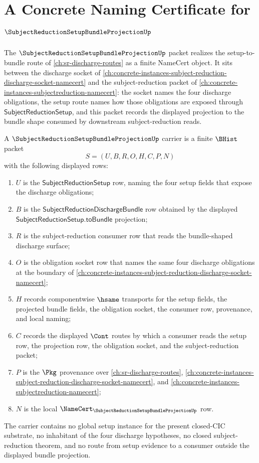\chapter{A Concrete Naming Certificate for $\SubjectReductionSetupBundleProjectionUp$}
\label{ch:concrete-instances-subjectreductionsetupbundleprojection-namecert}

The $\SubjectReductionSetupBundleProjectionUp$ packet realizes the setup-to-bundle route of \autoref{ch:sr-discharge-routes} as a finite NameCert object. It sits between the discharge socket of \autoref{ch:concrete-instances-subject-reduction-discharge-socket-namecert} and the subject-reduction packet of \autoref{ch:concrete-instances-subjectreduction-namecert}: the socket names the four discharge obligations, the setup route names how those obligations are exposed through $\mathsf{SubjectReductionSetup}$, and this packet records the displayed projection to the bundle shape consumed by downstream subject-reduction reads.

\begin{definition}
\label{def:subject-reduction-setup-bundle-projection-carrier}
A $\SubjectReductionSetupBundleProjectionUp$ carrier is a finite $\BHist$ packet
$$
S=(U,B,R,O,H,C,P,N)
$$
with the following displayed rows:
\begin{enumerate}
\item $U$ is the $\mathsf{SubjectReductionSetup}$ row, naming the four setup fields that expose the discharge obligations;
\item $B$ is the $\mathsf{SubjectReductionDischargeBundle}$ row obtained by the displayed $\mathsf{SubjectReductionSetup.toBundle}$ projection;
\item $R$ is the subject-reduction consumer row that reads the bundle-shaped discharge surface;
\item $O$ is the obligation socket row that names the same four discharge obligations at the boundary of \autoref{ch:concrete-instances-subject-reduction-discharge-socket-namecert};
\item $H$ records componentwise $\hsame$ transports for the setup fields, the projected bundle fields, the obligation socket, the consumer row, provenance, and local naming;
\item $C$ records the displayed $\Cont$ routes by which a consumer reads the setup row, the projection row, the obligation socket, and the subject-reduction packet;
\item $P$ is the $\Pkg$ provenance over \autoref{ch:sr-discharge-routes}, \autoref{ch:concrete-instances-subject-reduction-discharge-socket-namecert}, and \autoref{ch:concrete-instances-subjectreduction-namecert};
\item $N$ is the local $\NameCert_{\SubjectReductionSetupBundleProjectionUp}$ row.
\end{enumerate}
The carrier contains no global setup instance for the present closed-CIC substrate, no inhabitant of the four discharge hypotheses, no closed subject-reduction theorem, and no route from setup evidence to a consumer outside the displayed bundle projection.
\end{definition}

